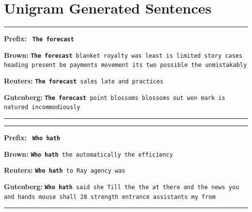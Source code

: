 \documentclass[11pt,a4paper]{article}
\begin{document}
\vspace{50pt}
\section{Unigram Generated Sentences}
\label{sec:unigram_generated_sentences}


\rule{0.49\textwidth}{0.4pt}
\label{forecast_ex_unigram}
\textbf{Prefix:} \texttt{ \textbf{The forecast} }
\vspace{1mm}

\textbf{Brown:}  \texttt{\textbf{The forecast} blanket royalty was least is limited story cases heading present be payments movement its two possible the unmistakably}
\vspace{1mm}

\textbf{Reuters:}    \texttt{\textbf{The forecast} sales late and practices}
\vspace{1mm}

\textbf{Gutenberg:} \texttt{\textbf{The forecast} point blossoms blossoms out won mark is natured incommodiously}

\rule{0.49\textwidth}{0.4pt}


\rule{0.49\textwidth}{0.4pt}
\label{hath_ex_unigram}
\textbf{Prefix:} \texttt{ \textbf{Who hath} }
\vspace{1mm}

\textbf{Brown:} \texttt{\textbf{Who hath} the automatically the efficiency}
\vspace{1mm}


\textbf{Reuters:}   \texttt{\textbf{Who hath} to Ray agency was}
\vspace{1mm}

\textbf{Gutenberg:} \texttt{\textbf{Who hath} said she Till the the at there and the news you and hands mouse shall 28 strength entrance assistants my from}

\rule{0.49\textwidth}{0.4pt}
\end{document}
